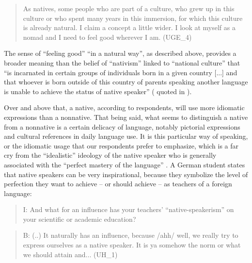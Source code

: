 \documentclass[output=paper]{../langscibook}
\begin{document}
\begin{quote}
As natives, some people who are part of a culture, who grew up in this culture or who spent many years in this immersion, for which this culture is already natural. I claim a concept a little wider. I look at myself as a nomad and I need to feel good wherever I am. (UGE\_4)
\end{quote}

The sense of “feeling good” “in a natural way”, as described above, provides a broader meaning than the belief of “nativism” linked to “national culture” that “is incarnated in certain groups of individuals born in a given country [...] and that whoever is born outside of this country of parents speaking another language is unable to achieve the status of native speaker” (\citealt[78]{Amin2004} quoted in \citealt[213]{Annous2011}). 

Over and above that, a native, according to respondents, will use more idiomatic expressions than a nonnative. That being said, what seems to distinguish a native from a nonnative is a certain delicacy of language, notably pictorial expressions and cultural references in daily language use. It is this particular way of speaking, or the idiomatic usage that our respondents prefer to emphasize, which is a far cry from the “idealistic” ideology of the native speaker who is generally associated with the “perfect mastery of the language” \citep{Annous2011}. A German student states that native speakers can be very inspirational, because they symbolize the level of perfection they want to achieve – or should achieve – as teachers of a foreign language:

\begin{quote}
I: And what for an influence has your teachers’ “native-speakerism” on your scientific or academic education?  
\end{quote}

\begin{quote}
B: (..) It naturally has an influence, because /ahh/ well, we really try to express ourselves as a native speaker. It is ya somehow the norm or what we should attain and... (UH\_1) 
\end{quote}
\end{document}
